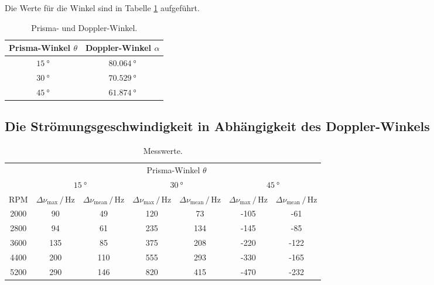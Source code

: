 Die Werte für die Winkel sind in Tabelle \ref{tab:Winkel} aufgeführt.
\begin{table}
    \centering
    \caption{Prisma- und Doppler-Winkel.}
    \label{tab:Winkel}
    \begin{tabular}{c c}
        \toprule
        Prisma-Winkel $\theta$ & Doppler-Winkel $\alpha$ \\
        \midrule
        $\SI{15}{\degree}$ & $\SI{80.064}{\degree}$ \\        
        $\SI{30}{\degree}$ & $\SI{70.529}{\degree}$ \\
        $\SI{45}{\degree}$ & $\SI{61.874}{\degree}$ \\        
        \bottomrule
    \end{tabular}
\end{table}

\subsection{Die Strömungsgeschwindigkeit in Abhängigkeit des Doppler-Winkels}

\begin{table}
    \centering
    \caption{Messwerte.}
    \label{tab:1Mess}
    \begin{tabular}{c c c c c c c}
        \toprule
            & \multicolumn{6}{c}{Prisma-Winkel $\theta$} \\
        \cmidrule(lr){2-7}
            & \multicolumn{2}{c}{$\SI{15}{\degree}$} & \multicolumn{2}{c}{$\SI{30}{\degree}$} & \multicolumn{2}{c}{$\SI{45}{\degree}$} \\
        RPM & $\Delta \nu_\text{max}\,/\,\si{\hertz}$ & $\Delta \nu_\text{mean}\,/\,\si{\hertz}$ & $\Delta \nu_\text{max}\,/\,\si{\hertz}$ & $\Delta \nu_\text{mean}\,/\,\si{\hertz}$ & $\Delta \nu_\text{max}\,/\,\si{\hertz}$ & $\Delta \nu_\text{mean}\,/\,\si{\hertz}$ \\
        \midrule
        2000 &  90 &  49 & 120 &  73 & -105 & -61  \\
        2800 &  94 &  61 & 235 & 134 & -145 & -85  \\
        3600 & 135 &  85 & 375 & 208 & -220 & -122 \\
        4400 & 200 & 110 & 555 & 293 & -330 & -165 \\
        5200 & 290 & 146 & 820 & 415 & -470 & -232 \\
        \bottomrule
    \end{tabular}
\end{table}


